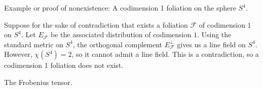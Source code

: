 \documentclass{../../templates/lkx_pset}
\begin{document}
\begin{problem}{3}
Example or proof of nonexistence: A codimension 1 foliation on the sphere $S^4$.
\end{problem}

\begin{solution}
	Suppose for the sake of contradiction that exists a foliation $\mathcal{F}$ of codimension $1$ on $S^4$. Let $E_\mathcal{F}$ be the associated distribution of codimension $1$. Using the standard metric on $S^4$, the orthogonal complement $E_\mathcal{F}^\perp$ gives us a line field on $S^4$. However, $\chi(S^4)=2$, so it cannot admit a line field. This is a contradiction, so a codimension 1 foliation does not exist.
\end{solution}

\begin{problem}{4}
The Frobenius tensor.
\end{problem}
\end{document}
